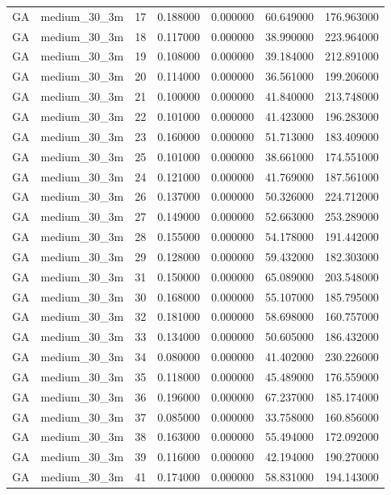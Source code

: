 \begin{tabular}{llrrrrr}
GA & medium_30_3m & 17 & 0.188000 & 0.000000 & 60.649000 & 176.963000 \\
GA & medium_30_3m & 18 & 0.117000 & 0.000000 & 38.990000 & 223.964000 \\
GA & medium_30_3m & 19 & 0.108000 & 0.000000 & 39.184000 & 212.891000 \\
GA & medium_30_3m & 20 & 0.114000 & 0.000000 & 36.561000 & 199.206000 \\
GA & medium_30_3m & 21 & 0.100000 & 0.000000 & 41.840000 & 213.748000 \\
GA & medium_30_3m & 22 & 0.101000 & 0.000000 & 41.423000 & 196.283000 \\
GA & medium_30_3m & 23 & 0.160000 & 0.000000 & 51.713000 & 183.409000 \\
GA & medium_30_3m & 25 & 0.101000 & 0.000000 & 38.661000 & 174.551000 \\
GA & medium_30_3m & 24 & 0.121000 & 0.000000 & 41.769000 & 187.561000 \\
GA & medium_30_3m & 26 & 0.137000 & 0.000000 & 50.326000 & 224.712000 \\
GA & medium_30_3m & 27 & 0.149000 & 0.000000 & 52.663000 & 253.289000 \\
GA & medium_30_3m & 28 & 0.155000 & 0.000000 & 54.178000 & 191.442000 \\
GA & medium_30_3m & 29 & 0.128000 & 0.000000 & 59.432000 & 182.303000 \\
GA & medium_30_3m & 31 & 0.150000 & 0.000000 & 65.089000 & 203.548000 \\
GA & medium_30_3m & 30 & 0.168000 & 0.000000 & 55.107000 & 185.795000 \\
GA & medium_30_3m & 32 & 0.181000 & 0.000000 & 58.698000 & 160.757000 \\
GA & medium_30_3m & 33 & 0.134000 & 0.000000 & 50.605000 & 186.432000 \\
GA & medium_30_3m & 34 & 0.080000 & 0.000000 & 41.402000 & 230.226000 \\
GA & medium_30_3m & 35 & 0.118000 & 0.000000 & 45.489000 & 176.559000 \\
GA & medium_30_3m & 36 & 0.196000 & 0.000000 & 67.237000 & 185.174000 \\
GA & medium_30_3m & 37 & 0.085000 & 0.000000 & 33.758000 & 160.856000 \\
GA & medium_30_3m & 38 & 0.163000 & 0.000000 & 55.494000 & 172.092000 \\
GA & medium_30_3m & 39 & 0.116000 & 0.000000 & 42.194000 & 190.270000 \\
GA & medium_30_3m & 41 & 0.174000 & 0.000000 & 58.831000 & 194.143000 \\

\end{tabular}
